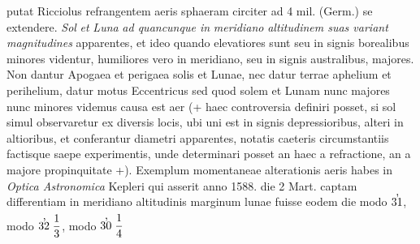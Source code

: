  \pstart [100 r\textsuperscript{o}]  putat Ricciolus\protect{}  refrangentem aeris sphaeram\protect{} circiter  ad 4 mil. (Germ.) se extendere. \textit{Sol}\protect{}\textit{  et }\textit{Luna}\protect{}\textit{ ad quancunque in }\textit{meridiano}\protect{}\textit{  altitudinem suas variant magnitudines} apparentes, et ideo quando  elevatiores sunt seu in signis  borealibus minores videntur, humiliores  vero in meridiano\protect{}, seu in signis australibus, majores.\pend 
\pstart {} Non dantur Apogaea\protect{} et perigaea\protect{} solis\protect{} et Lunae\protect{},  nec datur terrae\protect{} aphelium\protect{} et perihelium\protect{},  datur motus Eccentricus sed quod solem\protect{} et Lunam\protect{} nunc majores nunc  minores videmus causa est aer (+  haec controversia definiri posset, si sol\protect{} simul observaretur ex diversis  locis, ubi uni est in signis depressioribus, alteri in altioribus, et conferantur  diametri apparentes, notatis caeteris  circumstantiis factisque saepe experimentis, unde determinari posset  an haec a refractione, an a  majore propinquitate +). Exemplum  momentaneae alterationis aeris habes  in \textit{Optica Astronomica} Kepleri\protect{}  qui asserit anno 1588. die 2 Mart.  captam differentiam in meridiano\protect{} altitudinis marginum lunae\protect{} fuisse eodem die modo $31\hspace{-6pt}\raisebox{9pt}{,}\protect\hspace{3pt}$, modo $32\hspace{-6pt}\raisebox{9pt}{,}\protect\hspace{6pt}\displaystyle \frac{1}{3}\rule[-2mm]{0mm}{8mm}$, modo $30\hspace{-6pt}\raisebox{9pt}{,}\protect\hspace{6pt}\displaystyle \frac{1}{4}$ \edtext{}
